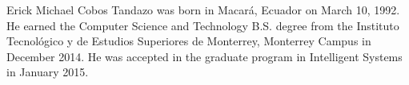 Erick Michael Cobos Tandazo was born in Macará, Ecuador on March 10, 1992. He earned the Computer Science and Technology B.S. degree from the Instituto Tecnológico y de Estudios Superiores de Monterrey, Monterrey Campus in December 2014. He was accepted in the graduate program in Intelligent Systems in January 2015.
